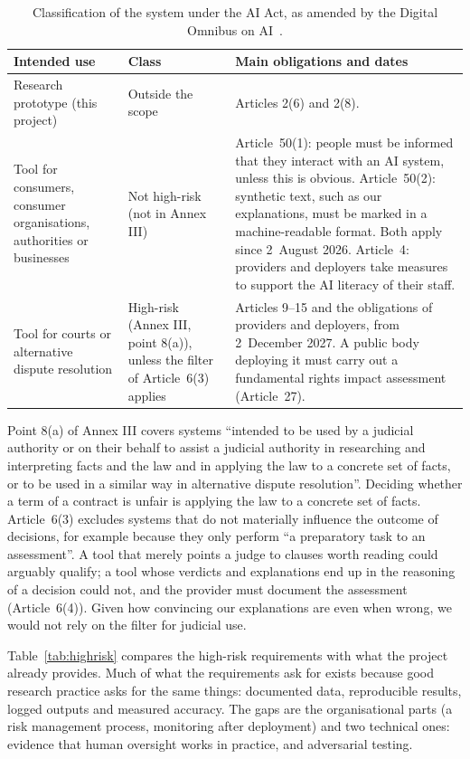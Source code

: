 \begin{table}[t]
\centering\small
\caption{Classification of the system under the AI Act, as amended by the Digital Omnibus on AI~\citep{omnibus2026}.}
\label{tab:aiact}
\begin{tabularx}{\textwidth}{@{}P{3.3cm}P{2.6cm}Y@{}}
\toprule
Intended use & Class & Main obligations and dates \\
\midrule
Research prototype (this project) & Outside the scope & Articles 2(6) and 2(8). \\
Tool for consumers, consumer organisations, authorities or businesses & Not high-risk (not in Annex III) & Article~50(1): people must be informed that they interact with an AI system, unless this is obvious. Article~50(2): synthetic text, such as our explanations, must be marked in a machine-readable format. Both apply since 2~August 2026. Article~4: providers and deployers take measures to support the AI literacy of their staff. \\
Tool for courts or alternative dispute resolution & High-risk (Annex III, point 8(a)), unless the filter of Article~6(3) applies & Articles 9--15 and the obligations of providers and deployers, from 2~December 2027. A public body deploying it must carry out a fundamental rights impact assessment (Article~27). \\
\bottomrule
\end{tabularx}
\end{table}

Point 8(a) of Annex III covers systems ``intended to be used by a judicial authority or on their behalf to assist a judicial authority in researching and interpreting facts and the law and in applying the law to a concrete set of facts, or to be used in a similar way in alternative dispute resolution''. Deciding whether a term of a contract is unfair is applying the law to a concrete set of facts. Article~6(3) excludes systems that do not materially influence the outcome of decisions, for example because they only perform ``a preparatory task to an assessment''. A tool that merely points a judge to clauses worth reading could arguably qualify; a tool whose verdicts and explanations end up in the reasoning of a decision could not, and the provider must document the assessment (Article~6(4)). Given how convincing our explanations are even when wrong, we would not rely on the filter for judicial use.

Table~\ref{tab:highrisk} compares the high-risk requirements with what the project already provides. Much of what the requirements ask for exists because good research practice asks for the same things: documented data, reproducible results, logged outputs and measured accuracy. The gaps are the organisational parts (a risk management process, monitoring after deployment) and two technical ones: evidence that human oversight works in practice, and adversarial testing.

